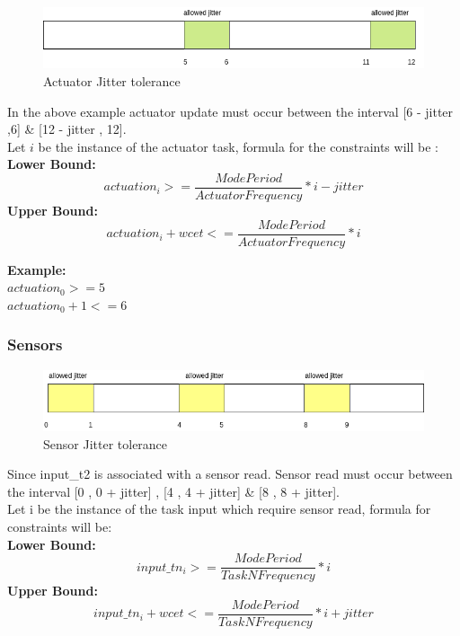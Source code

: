 \documentclass[16pt]{report}
\begin{document}
\begin{figure}[H]
\centering
\includegraphics[width=0.9\linewidth]{3actJitter.png}
\caption{Actuator Jitter tolerance}
\end{figure}

In the above example actuator update must occur between the interval [6 - jitter  ,6] \& [12 - jitter , 12].\\
Let $i$ be the instance of the actuator task, formula for the constraints will be :
\textbf{Lower Bound:}
\begin{equation}
    actuation_i  >=  \frac{Mode Period}{Actuator Frequency}* i - jitter
\end{equation}
\textbf{Upper Bound:}
\begin{equation}
    actuation_i + wcet  <=  \frac{Mode Period}{Actuator Frequency}* i
\end{equation}

\noindent
\textbf{Example:}\\
    $actuation_0 >= 5$\\
    $actuation_0 + 1 <= 6$

\subsubsection{Sensors}
\begin{figure}[H]
\centering
\includegraphics[width=0.9\linewidth]{4senJitter.png}
\caption{Sensor Jitter tolerance}
\end{figure}
Since input\_t2 is associated with a sensor read. Sensor read must occur between the interval [0 , 0 + jitter] , [4 , 4 + jitter] \& [8 , 8 + jitter]. \\
Let i be the instance of the task input which require sensor read, formula for constraints will be:\\
\textbf{Lower Bound:}
\begin{equation}
    input\_tn_{i}  >=  \frac{Mode Period}{TaskN Frequency}* i
\end{equation}
\textbf{Upper Bound:}
\begin{equation}
    input\_tn_{i} + wcet  <=  \frac{Mode Period}{TaskN Frequency}* i + jitter 
\end{equation}
\end{document}
